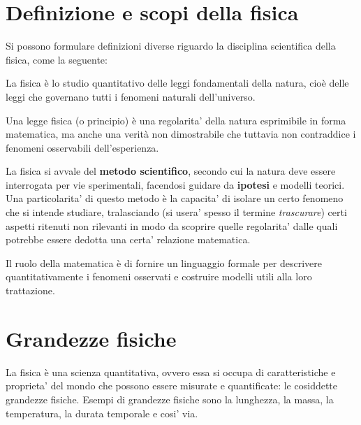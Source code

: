 

\marginpar{\minitoc}

\section{Definizione e scopi della fisica}

Si possono formulare definizioni diverse riguardo la disciplina scientifica
della fisica, come la seguente:

\vspace{8pt}
\begin{tcolorbox}[colback = yellow!30, colframe = yellow!30!black, title = {Fisica}]
La fisica è lo studio quantitativo delle leggi fondamentali della natura, cioè
delle leggi che governano tutti i fenomeni naturali dell'universo.

Una legge fisica (o principio) è una regolarita' della natura esprimibile in forma
matematica, ma anche una verità non dimostrabile che tuttavia non contraddice i
fenomeni osservabili dell'esperienza.
\end{tcolorbox}
\vspace{5pt}

La fisica si avvale del \textbf{metodo scientifico}, secondo cui la natura deve
essere interrogata per vie sperimentali, facendosi guidare da \textbf{ipotesi} e
modelli teorici. Una particolarita' di questo metodo è la capacita' di isolare
un certo fenomeno che si intende studiare, tralasciando (si usera' spesso il
termine \textit{trascurare}) certi aspetti ritenuti non rilevanti in modo da
scoprire quelle regolarita' dalle quali potrebbe essere dedotta una certa'
relazione matematica.

Il ruolo della matematica è di fornire un linguaggio formale per descrivere
quantitativamente i fenomeni osservati e costruire modelli utili alla loro
trattazione.



\section{Grandezze fisiche}
La fisica è una scienza quantitativa, ovvero essa si occupa di caratteristiche
e proprieta' del mondo che possono essere misurate e quantificate: le cosiddette
grandezze fisiche. Esempi di grandezze fisiche sono la lunghezza, la massa, la
temperatura, la durata temporale e cosi' via.

